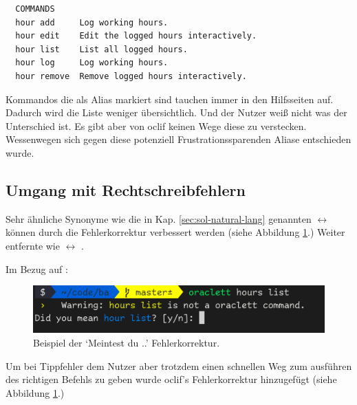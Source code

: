 \documentclass[oneside,bibliography=totocnumbered,BCOR=5mm]{scrbook}
\newenvironment{code}{\captionsetup{type=listing, skip=0pt}}{}
\begin{document}
\begin{code}
  \medskip
  \begin{verbatim}
  COMMANDS
  hour add     Log working hours.
  hour edit    Edit the logged hours interactively.
  hour list    List all logged hours.
  hour log     Log working hours.
  hour remove  Remove logged hours interactively.
  \end{verbatim}
\end{code}

Kommandos die als Alias markiert sind tauchen immer in den Hilfsseiten auf.
Dadurch wird die Liste weniger übersichtlich. Und der Nutzer weiß nicht was
der Unterschied ist. Es gibt aber von oclif keinen Wege diese zu verstecken.
Wessenwegen sich gegen diese potenziell Frustrationssparenden Aliase entschieden
wurde.

\subsection{Umgang mit Rechtschreibfehlern}

Sehr ähnliche Synonyme wie die in Kap. \ref{sec:sol-natural-lang} genannten
 $\leftrightarrow$  können durch die
Fehlerkorrektur verbessert werden (siehe Abbildung \ref{fig:did-you-mean}.)
Weiter entfernte wie  $\leftrightarrow$ .

Im Bezug auf :

\begin{figure}
  \centering
  \includegraphics[scale=0.5]{did-you-mean.png}
  \caption{Beispiel der `Meintest du ..' Fehlerkorrektur.}
  \label{fig:did-you-mean}
\end{figure}

\smallskip

Um bei Tippfehler dem Nutzer aber trotzdem einen schnellen Weg zum ausführen
des richtigen Befehls zu geben wurde oclif's Fehlerkorrektur hinzugefügt (siehe
Abbildung \ref{fig:did-you-mean}.)
\end{document}

